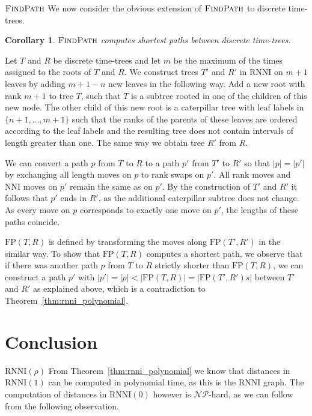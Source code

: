 \documentclass[11pt]{amsart}
\newtheorem{corollary}{Corollary}
\newcommand{\rnni}{\mathrm{RNNI}}
\newcommand{\findpath}{\textsc{FindPath}}
\newcommand{\nni}{\mathrm{NNI}}
\newcommand{\fp}{\mathrm{FP}}
\newcommand{\np}{\mathcal{NP}}
\newcommand{\p}{\mathcal{P}}
\newcommand{\summary}[1]{} %
\begin{document}
\summary{Generalising} $\findpath$ \summary{for discrete time-trees}
We now consider the obvious extension of $\findpath$ to discrete time-trees.

\begin{corollary}
	$\findpath$ computes shortest paths between discrete time-trees.
\end{corollary}

\proof
	Let $T$ and $R$ be discrete time-trees and let $m$ be the maximum of the times assigned to the roots of $T$ and $R$.
	We construct trees $T'$ and $R'$ in $\rnni$ on $m + 1$ leaves by adding $m + 1 - n$ new leaves in the following way.
	Add a new root with rank $m+1$ to tree $T$, such that $T$ is a subtree rooted in one of the children of this new node.
	The other child of this new root is a caterpillar tree with leaf labels in $\{n+1, \ldots, m+1\}$ such that the ranks of the parents of these leaves are ordered according to the leaf labels and the resulting tree does not contain intervals of length greater than one.
	The same way we obtain tree $R'$ from $R$.

	We can convert a path $p$ from $T$ to $R$ to a path $p'$ from $T'$ to $R'$ so that $|p| = |p'|$ by exchanging all length moves on $p$ to rank swaps on $p'$.
	All rank moves and $\nni$ moves on $p'$ remain the same as on $p'$.
	By the construction of $T'$ and $R'$ it follows that $p'$ ends in $R'$, as the additional caterpillar subtree does not change.
	As every move on $p$ corresponds to exactly one move on $p'$, the lengths of these paths coincide.

	$\fp(T,R)$ is defined by transforming the moves along $\fp(T',R')$ in the similar way.
	To show that $\fp(T, R)$ computes a shortest path, we observe that if there was another path $p$ from $T$ to $R$ strictly shorter than $\fp(T, R)$, we can construct a path $p'$ with $|p'| = |p| < |\fp(T,R)| = |\fp(T',R')s|$ between $T'$ and $R'$ as explained above, which is a contradiction to Theorem~\ref{thm:rnni_polynomial}.
\endproof

\summary{Why the complexity of $\rnni(\rho)$ might be different from $\nni$ or $\rnni$ for $\rho$ big enough.}


\section{Conclusion}

\summary{Everything we know so far about the complexity of} $\rnni(\rho)$ \summary{-- $\rnni(1) \in \p$ and $\rnni(0) \in \np$}
From Theorem~\ref{thm:rnni_polynomial} we know that distances in $\rnni(1)$ can be computed in polynomial time, as this is the $\rnni$ graph.
The computation of distances in $\rnni(0)$ however is $\np$-hard, as we can follow from the following observation.
\end{document}
